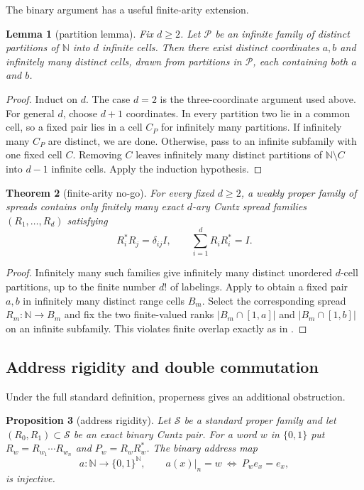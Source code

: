 \documentclass[11pt]{article}
\newtheorem{theorem}{Theorem}[section]
\newtheorem{proposition}[theorem]{Proposition}
\newtheorem{lemma}[theorem]{Lemma}
\theoremstyle{definition}
\theoremstyle{remark}
\newcommand{\N}{\mathbb N}
\begin{document}
The binary argument has a useful finite-arity extension.

\begin{lemma}[partition lemma]\label{lem:partition}
Fix $d\ge2$.  Let $\mathscr P$ be an infinite family of distinct partitions of
$\N$ into $d$ infinite cells.  Then there exist distinct coordinates $a,b$ and
infinitely many distinct cells, drawn from partitions in $\mathscr P$, each
containing both $a$ and $b$.
\end{lemma}

\begin{proof}
Induct on $d$.  The case $d=2$ is the three-coordinate argument used above.
For general $d$, choose $d+1$ coordinates.  In every partition two lie in a
common cell, so a fixed pair lies in a cell $C_P$ for infinitely many
partitions.  If infinitely many $C_P$ are distinct, we are done.  Otherwise,
pass to an infinite subfamily with one fixed cell $C$.  Removing $C$ leaves
infinitely many distinct partitions of $\N\setminus C$ into $d-1$ infinite
cells.  Apply the induction hypothesis.
\end{proof}

\begin{theorem}[finite-arity no-go]\label{thm:dary}
For every fixed $d\ge2$, a weakly proper family of spreads contains only
finitely many exact $d$-ary Cuntz spread families
$(R_1,\dots,R_d)$ satisfying
\[
 R_i^*R_j=\delta_{ij}I,
 \qquad \sum_{i=1}^dR_iR_i^*=I.
\]
\end{theorem}

\begin{proof}
Infinitely many such families give infinitely many distinct unordered
$d$-cell partitions, up to the finite number $d!$ of labelings.  Apply
 to obtain a fixed pair $a,b$ in infinitely many distinct
range cells $B_m$.  Select the corresponding spread $R_m:\N\to B_m$ and fix
the two finite-valued ranks $|B_m\cap[1,a]|$ and $|B_m\cap[1,b]|$ on an
infinite subfamily.  This violates finite overlap exactly as in
.
\end{proof}

\subsection{Address rigidity and double commutation}

Under the full standard definition, properness gives an additional obstruction.

\begin{proposition}[address rigidity]\label{prop:address}
Let $\mathscr S$ be a standard proper family and let $(R_0,R_1)\subset\mathscr S$
be an exact binary Cuntz pair.  For a word $w$ in $\{0,1\}$ put
$R_w=R_{w_1}\cdots R_{w_n}$ and $P_w=R_wR_w^*$.  The binary address map
\[
 a:\N\longrightarrow\{0,1\}^{\N},
 \qquad
 a(x)|_n=w\ \Longleftrightarrow\ P_we_x=e_x,
\]
is injective.
\end{proposition}
\end{document}
